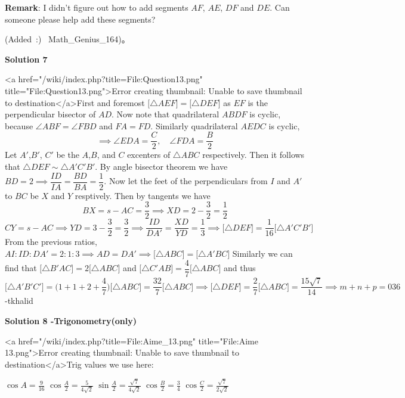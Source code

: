 \begin{enumerate}
 \textbf{Remark}: I didn't figure out how to add segments $AF$, $AE$, $DF$ and $DE$. Can someone please help add these segments? 

 (Added :) ~Math\_Genius\_164)。

 



\textbf{Solution 7}

<a href="/wiki/index.php?title=File:Question13.png" title="File:Question13.png">Error creating thumbnail: Unable to save thumbnail to destination</a>First and foremost $\big[\triangle{AEF}\big]=\big[\triangle{DEF}\big]$ as $EF$ is the perpendicular bisector of $AD$. Now   note that quadrilateral $ABDF$ is cyclic, because $\angle{ABF}=\angle{FBD}$ and $FA=FD$. Similarly quadrilateral $AEDC$ is cyclic, 
 \[\implies \angle{EDA}=\dfrac{C}{2}, \quad \angle{FDA}=\dfrac{B}{2}\]Let $A'$,$B'$, $C'$ be the $A$,$B$, and $C$ excenters of $\triangle{ABC}$ respectively. Then it follows that $\triangle{DEF} \sim \triangle{A'C'B'}$. By angle bisector theorem we have $BD=2 \implies \dfrac{ID}{IA}=\dfrac{BD}{BA}=\dfrac{1}{2}$. Now let the feet of the perpendiculars from $I$ and $A'$ to $BC$ be $X$ and $Y$ resptively. Then by tangents we have 
 \[BX=s-AC=\dfrac{3}{2} \implies XD=2-\dfrac{3}{2}=\dfrac{1}{2}\] 
 \[CY=s-AC \implies YD=3-\dfrac{3}{2}=\dfrac{3}{2} \implies \dfrac{ID}{DA'}=\dfrac{XD}{YD}=\dfrac{1}{3} \implies \big[\triangle{DEF}\big]=\dfrac{1}{16}\big[\triangle{A'C'B'}\big]\] From the previous ratios, $AI:ID:DA'=2:1:3 \implies AD=DA' \implies \big[\triangle{ABC}\big]=\big[\triangle{A'BC}\big]$ Similarly we can find that $\big[\triangle{B'AC}\big]=2\big[\triangle{ABC}\big]$ and $\big[\triangle{C'AB}\big]=\dfrac{4}{7}\big[\triangle{ABC}\big]$ and thus 
 \[\big[\triangle{A'B'C'}\big]=\bigg(1+1+2+\dfrac{4}{7}\bigg)\big[\triangle{ABC}\big]=\dfrac{32}{7}\big[\triangle{ABC}\big] \implies \big[\triangle{DEF}\big]=\dfrac{2}{7}\big[\triangle{ABC}\big]=\dfrac{15\sqrt{7}}{14} \implies m+n+p = \boxed{036}\]-tkhalid

 



\textbf{Solution 8 -Trigonometry(only)}

<a href="/wiki/index.php?title=File:Aime\_13.png" title="File:Aime 13.png">Error creating thumbnail: Unable to save thumbnail to destination</a>Trig values we use here:

 $\cos A = \frac{9}{16}$
$\cos \frac{A}{2} = \frac{5}{4\sqrt2}$
$\sin \frac{A}{2} = \frac{\sqrt7}{4\sqrt2}$
$\cos \frac{B}{2} = \frac{3}{4}$
$\cos \frac{C}{2} = \frac{\sqrt7}{2\sqrt2}$


\end{enumerate}
